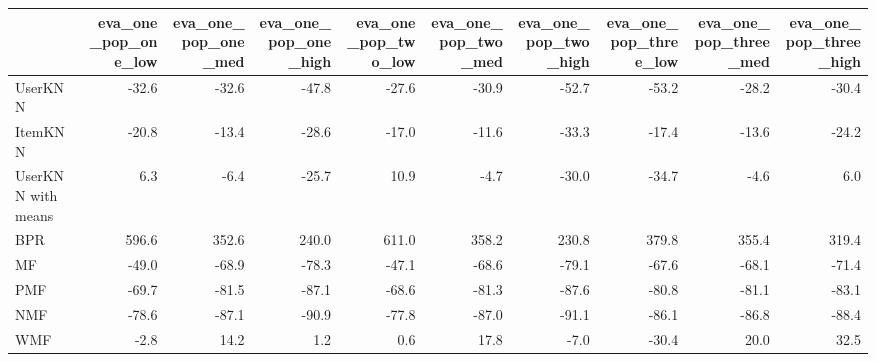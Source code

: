 \begin{tabular}{lrrrrrrrrr}
\toprule
{} &  eva\_one\_pop\_one\_low &  eva\_one\_pop\_one\_med &  eva\_one\_pop\_one\_high &  eva\_one\_pop\_two\_low &  eva\_one\_pop\_two\_med &  eva\_one\_pop\_two\_high &  eva\_one\_pop\_three\_low &  eva\_one\_pop\_three\_med &  eva\_one\_pop\_three\_high \\
\midrule
UserKNN            &                -32.6 &                -32.6 &                 -47.8 &                -27.6 &                -30.9 &                 -52.7 &                  -53.2 &                  -28.2 &                   -30.4 \\
ItemKNN            &                -20.8 &                -13.4 &                 -28.6 &                -17.0 &                -11.6 &                 -33.3 &                  -17.4 &                  -13.6 &                   -24.2 \\
UserKNN with means &                  6.3 &                 -6.4 &                 -25.7 &                 10.9 &                 -4.7 &                 -30.0 &                  -34.7 &                   -4.6 &                     6.0 \\
BPR                &                596.6 &                352.6 &                 240.0 &                611.0 &                358.2 &                 230.8 &                  379.8 &                  355.4 &                   319.4 \\
MF                 &                -49.0 &                -68.9 &                 -78.3 &                -47.1 &                -68.6 &                 -79.1 &                  -67.6 &                  -68.1 &                   -71.4 \\
PMF                &                -69.7 &                -81.5 &                 -87.1 &                -68.6 &                -81.3 &                 -87.6 &                  -80.8 &                  -81.1 &                   -83.1 \\
NMF                &                -78.6 &                -87.1 &                 -90.9 &                -77.8 &                -87.0 &                 -91.1 &                  -86.1 &                  -86.8 &                   -88.4 \\
WMF                &                 -2.8 &                 14.2 &                   1.2 &                  0.6 &                 17.8 &                  -7.0 &                  -30.4 &                   20.0 &                    32.5 \\

\end{tabular}
